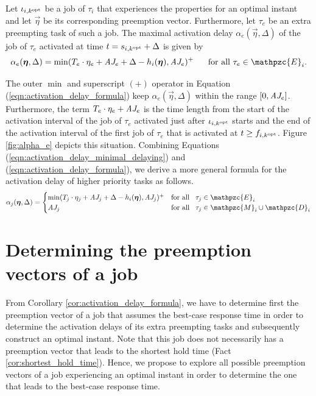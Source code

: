 \begin{corollary}\label{cor:activation_delay_formula}
	Let $\iota_{i,k^{\rm{opt}}}$ be a job of $\tau_i$ that experiences the properties for an optimal instant and let $\vec{\eta}$ be its corresponding preemption vector. Furthermore, let $\tau_e$ be an extra preempting task of such a job. The maximal activation delay $\alpha_e(\vec{\eta},\Delta)$ of the job of $\tau_e$ activated at time $t = s_{i,k^{\rm{opt}}}+\Delta$ is given by
	\begin{align} \label{eqn:activation_delay_formula}
		\alpha_e(\vec{\eta},\Delta) = \min(T_e \cdot \eta_e + \aj_e + \Delta - h_i(\vec{\eta}), \aj_e)^+ \hspace{.6cm} \textnormal{for all $\tau_e \in \mathpzc{E}_i$}.
	\end{align}
\end{corollary}

The outer $\min$ and superscript $(+)$ operator in Equation (\ref{eqn:activation_delay_formula}) keep $\alpha_e(\vec{\eta},\Delta)$ within the range $[0,\mbox{\it AJ}_e]$. Furthermore, the term $T_e \cdot \eta_e + \mbox{\it AJ}_e$ is the time length from the start of the activation interval of the job of $\tau_e$ activated just after $\iota_{i,k^{\rm{opt}}}$ starts and the end of the activation interval of the first job of $\tau_e$ that is activated at $t \geq f_{i,k^{\rm{opt}}}$. Figure \ref{fig:alpha_e} depicts this situation. Combining Equations (\ref{eqn:activation_delay_minimal_delaying}) and (\ref{eqn:activation_delay_formula}), we derive a more general formula for the activation delay of higher priority tasks as follows.
\begin{align} \label{eqn:activation_delay}
	\alpha_j(\vec{\eta},\Delta) = \begin{cases} 
	\min(T_j \cdot \eta_j + \aj_j + \Delta - h_i(\vec{\eta}), \aj_j)^+ & \text{for all} \hspace{3mm} \tau_j \in \mathpzc{E}_i\\
	\aj_j & \text{for all} \hspace{3mm} \tau_j \in \mathpzc{M}_i \cup \mathpzc{D}_i
	\end{cases}
\end{align}


\section{Determining the preemption vectors of a job}\label{sec:preemption_vectors_of_a_job}
From Corollary \ref{cor:activation_delay_formula}, we have to determine first the preemption vector of a job that assumes the best-case response time in order to determine the activation delays of its extra preempting tasks and subsequently construct an optimal instant. Note that this job does not necessarily has a preemption vector that leads to the shortest hold time (Fact \ref{cor:shortest_hold_time}). Hence, we propose to explore all possible preemption vectors of a job experiencing an optimal instant in order to determine the one that leads to the best-case response time.

